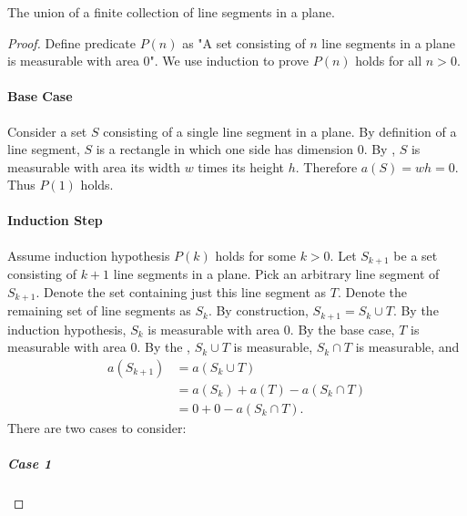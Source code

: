 \documentclass{report}
\begin{document}
\subsubsection{}%
\label{ssub:exercise-1.7.1c}

The union of a finite collection of line segments in a plane.

\begin{proof}

  Define predicate $P(n)$ as "A set consisting of $n$ line segments in a plane
    is measurable with area $0$".
  We use induction to prove $P(n)$ holds for all $n > 0$.

  \paragraph{Base Case}%

    Consider a set $S$ consisting of a single line segment in a plane.
    By definition of a line segment, $S$ is a rectangle in which one side has
      dimension $0$.
    By , $S$ is measurable with area its width
      $w$ times its height $h$.
    Therefore $a(S) = wh = 0$.
    Thus $P(1)$ holds.

  \paragraph{Induction Step}%

    Assume induction hypothesis $P(k)$ holds for some $k > 0$.
    Let $S_{k+1}$ be a set consisting of $k + 1$ line segments in a plane.
    Pick an arbitrary line segment of $S_{k+1}$.
    Denote the set containing just this line segment as $T$.
    Denote the remaining set of line segments as $S_k$.
    By construction, $S_{k+1} = S_k \cup T$.
    By the induction hypothesis, $S_k$ is measurable with area $0$.
    By the base case, $T$ is measurable with area $0$.
    By the , $S_k \cup T$ is measurable,
      $S_k \cap T$ is measurable, and
      \begin{align}
        a(S_{k+1})
          & = a(S_k \cup T) \nonumber \\
          & = a(S_k) + a(T) - a(S_k \cap T) \nonumber \\
          & = 0 + 0 - a(S_k \cap T). \label{ssub:exercise-1.7.1c-eq1}
      \end{align}
    There are two cases to consider:

    \subparagraph{Case 1}%


\end{proof}
\end{document}
